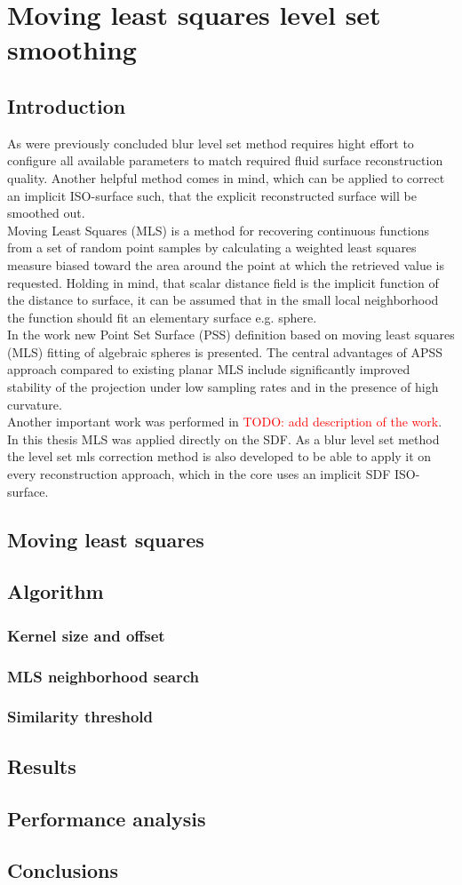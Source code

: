 \chapter{Moving least squares level set smoothing}
\section{Introduction}
As were previously concluded blur level set method requires hight effort to configure all available parameters to match required fluid surface reconstruction quality. Another helpful method comes in mind, which can be applied to correct an implicit ISO-surface such, that the explicit reconstructed surface will be smoothed out.\\
Moving Least Squares (MLS) is a method for recovering continuous functions from a set of random point samples by calculating a weighted least squares measure biased toward the area around the point at which the retrieved value is requested. Holding in mind, that scalar distance field is the implicit function of the distance to surface, it can be assumed that in the small local neighborhood the function should fit an elementary surface e.g. sphere.\\
In the work \cite{Apss} new Point Set Surface (PSS) definition based on moving least squares (MLS) fitting of algebraic spheres is presented. The central advantages of APSS approach compared to existing planar MLS include significantly improved stability of the projection under low sampling rates and in the presence of high curvature.\\
Another important work was performed in \cite{PssLkr} \textcolor{red}{TODO: add description of the work}.\\
In this thesis MLS was applied directly on the SDF. As a blur level set method the level set mls correction method is also developed to be able to apply it on every reconstruction approach, which in the core uses an implicit SDF ISO-surface.  
\section{Moving least squares}
\section{Algorithm}
\subsection{Kernel size and offset}
\subsection{MLS neighborhood search}
\subsection{Similarity threshold}
\section{Results}
\section{Performance analysis}
\section{Conclusions}